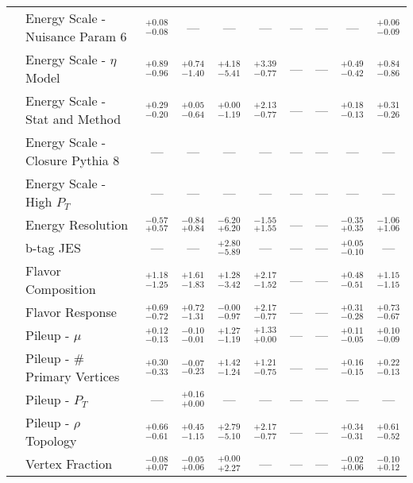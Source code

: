 \begin{tabular}{|cl||cccccc|c||c|}
\cline{2-10}
&Energy Scale - Nuisance Param 6 &  $^{+0.08}_{-0.08}$  & --- & --- & --- & --- & --- & --- &  $^{+0.06}_{-0.09}$ \\ 
\cline{2-10}
&Energy Scale - $\eta$ Model &  $^{+0.89}_{-0.96}$  &  $^{+0.74}_{-1.40}$  &  $^{+4.18}_{-5.41}$  &  $^{+3.39}_{-0.77}$  & --- & --- &  $^{+0.49}_{-0.42}$  &  $^{+0.84}_{-0.86}$ \\ 
\cline{2-10}
&Energy Scale - Stat and Method &  $^{+0.29}_{-0.20}$  &  $^{+0.05}_{-0.64}$  &  $^{+0.00}_{-1.19}$  &  $^{+2.13}_{-0.77}$  & --- & --- &  $^{+0.18}_{-0.13}$  &  $^{+0.31}_{-0.26}$ \\ 
\cline{2-10}
&Energy Scale - Closure Pythia 8 & --- & --- & --- & --- & --- & --- & --- & ---\\ 
\cline{2-10}
&Energy Scale - High $P_{T}$ & --- & --- & --- & --- & --- & --- & --- & ---\\ 
\cline{2-10}
&Energy Resolution &  $^{-0.57}_{+0.57}$  &  $^{-0.84}_{+0.84}$  &  $^{-6.20}_{+6.20}$  &  $^{-1.55}_{+1.55}$  & --- & --- &  $^{-0.35}_{+0.35}$  &  $^{-1.06}_{+1.06}$ \\ 
\cline{2-10}
&b-tag JES & --- & --- &  $^{+2.80}_{-5.89}$  & --- & --- & --- &  $^{+0.05}_{-0.10}$  & ---\\ 
\cline{2-10}
&Flavor Composition &  $^{+1.18}_{-1.25}$  &  $^{+1.61}_{-1.83}$  &  $^{+1.28}_{-3.42}$  &  $^{+2.17}_{-1.52}$  & --- & --- &  $^{+0.48}_{-0.51}$  &  $^{+1.15}_{-1.15}$ \\ 
\cline{2-10}
&Flavor Response &  $^{+0.69}_{-0.72}$  &  $^{+0.72}_{-1.31}$  &  $^{-0.00}_{-0.97}$  &  $^{+2.17}_{-0.77}$  & --- & --- &  $^{+0.31}_{-0.28}$  &  $^{+0.73}_{-0.67}$ \\ 
\cline{2-10}
&Pileup - $\mu$ &  $^{+0.12}_{-0.13}$  &  $^{-0.10}_{-0.01}$  &  $^{+1.27}_{-1.19}$  &  $^{+1.33}_{+0.00}$  & --- & --- &  $^{+0.11}_{-0.05}$  &  $^{+0.10}_{-0.09}$ \\ 
\cline{2-10}
&Pileup - \# Primary Vertices &  $^{+0.30}_{-0.33}$  &  $^{-0.07}_{-0.23}$  &  $^{+1.42}_{-1.24}$  &  $^{+1.21}_{-0.75}$  & --- & --- &  $^{+0.16}_{-0.15}$  &  $^{+0.22}_{-0.13}$ \\ 
\cline{2-10}
&Pileup -  $P_{T}$ & --- &  $^{+0.16}_{+0.00}$  & --- & --- & --- & --- & --- & ---\\ 
\cline{2-10}
&Pileup - $\rho$ Topology &  $^{+0.66}_{-0.61}$  &  $^{+0.45}_{-1.15}$  &  $^{+2.79}_{-5.10}$  &  $^{+2.17}_{-0.77}$  & --- & --- &  $^{+0.34}_{-0.31}$  &  $^{+0.61}_{-0.52}$ \\ 
\cline{2-10}
&Vertex Fraction &  $^{-0.08}_{+0.07}$  &  $^{-0.05}_{+0.06}$  &  $^{+0.00}_{+2.27}$  & --- & --- & --- &  $^{-0.02}_{+0.06}$  &  $^{-0.10}_{+0.12}$ \\ 

\end{tabular}
